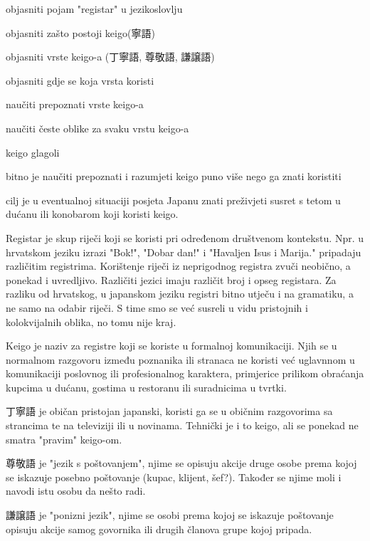 
\author{Ivan Petranović}

	
	
	\begin{hyou}
		\item objasniti pojam "registar" u jezikoslovlju
		\item objasniti zašto postoji keigo(寧語)
		\item objasniti vrste keigo-a (丁寧語, 尊敬語, 謙譲語)
		\item objasniti gdje se koja vrsta koristi
		\item naučiti prepoznati vrste keigo-a
		\item naučiti česte oblike za svaku vrstu keigo-a
		\item keigo glagoli
	\end{hyou}

	
	\begin{hyou}
		\item bitno je naučiti prepoznati i razumjeti keigo puno više nego ga znati koristiti
		\item cilj je u eventualnoj situaciji posjeta Japanu znati preživjeti susret s tetom u dućanu ili konobarom koji koristi keigo.
	\end{hyou}

	
	Registar je skup riječi koji se koristi pri određenom društvenom kontekstu. Npr. u hrvatskom jeziku izrazi "Bok!", "Dobar dan!" i "Havaljen Isus i Marija." pripadaju različitim registrima. Korištenje riječi iz neprigodnog registra zvuči neobično, a ponekad i uvredljivo. Različiti jezici imaju različit broj i opseg registara. Za razliku od hrvatskog, u japanskom jeziku registri bitno utječu i na gramatiku, a ne samo na odabir riječi. S time smo se već susreli u vidu pristojnih i kolokvijalnih oblika, no tomu nije kraj.
	
	Keigo je naziv za registre koji se koriste u formalnoj komunikaciji. Njih se u normalnom razgovoru između poznanika ili stranaca ne koristi već uglavnnom u komunikaciji poslovnog ili profesionalnog karaktera, primjerice prilikom obraćanja kupcima u dućanu, gostima u restoranu ili suradnicima u tvrtki.
	
	丁寧語 je običan pristojan japanski, koristi ga se u običnim razgovorima sa strancima te na televiziji ili u novinama. Tehnički je i to keigo, ali se ponekad ne smatra "pravim" keigo-om.
	
	尊敬語 je "jezik s poštovanjem", njime se opisuju akcije druge osobe prema kojoj se iskazuje posebno poštovanje (kupac, klijent, šef?). Također se njime moli i navodi istu osobu da nešto radi.
	
	謙譲語 je "ponizni jezik", njime se osobi prema kojoj se iskazuje poštovanje opisuju akcije samog govornika ili drugih članova grupe kojoj pripada.
